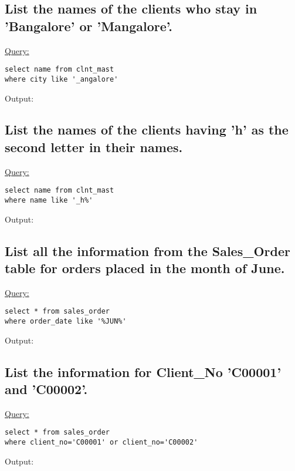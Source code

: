 \documentclass[a4paper,11pt]{article}
\begin{document}
\subsection{List the names of the clients who stay in 'Bangalore' or 'Mangalore'.}
\underline{Query:}
\begin{lstlisting}[showstringspaces=false]
select name from clnt_mast
where city like '_angalore'
\end{lstlisting}
Output:
\begin{figure}[H]
\centering
{}
\end{figure}
\bigskip

\subsection{List the names of the clients having 'h' as the second letter in their names.}
\underline{Query:}
\begin{lstlisting}[showstringspaces=false]
select name from clnt_mast
where name like '_h%'
\end{lstlisting}
Output:
\begin{figure}[H]
\centering
{}
\end{figure}
\smallskip

\subsection{List all the information from the Sales\_Order table for orders placed in the month of June.}
\underline{Query:}
\begin{lstlisting}[showstringspaces=false]
select * from sales_order
where order_date like '%JUN%'
\end{lstlisting}
Output:
\begin{figure}[H]
\centering
{}
\end{figure}
\bigskip

\subsection{List the information for Client\_No 'C00001' and 'C00002'.}
\underline{Query:}
\begin{lstlisting}[showstringspaces=false]
select * from sales_order
where client_no='C00001' or client_no='C00002'
\end{lstlisting}
Output:
\begin{figure}[H]
\centering
{}
\end{figure}
\bigskip
\end{document}
